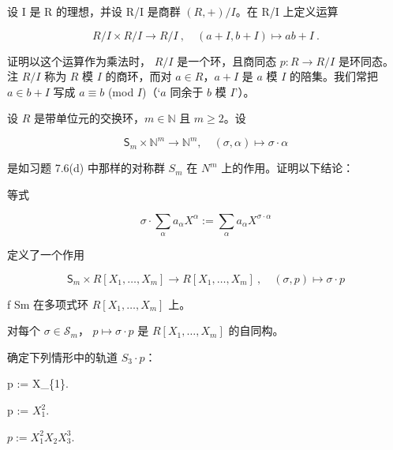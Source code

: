 \begin{exercises}
\begin{items}
\item

设 I 是 R 的理想，并设 R/I 是商群  $ (R, +)/I $。在 R/I 上定义运算

\[
R/I\times R/I\to R/I~,\quad(a+I,b+I)\mapsto a b+I~.
\]

证明以这个运算作为乘法时， $ R/I $ 是一个环，且商同态  $ p: R \to R/I $ 是环同态。
注 $R/I$ 称为 $R$ 模 $I$ 的商环，而对 $a \in R$，$a + I$ 是 $a$ 模 $I$ 的陪集。我们常把 $a \in b + I$ 写成 $a \equiv b$ (mod $I$)（‘$a$ 同余于 $b$ 模 $I$’）。

\end{items}

\item

设 $R$ 是带单位元的交换环，$m \in \mathbb{N}$ 且 $m \geq 2$。设

\[
\mathsf{S}_{m}\times\mathbb{N}^{m}\to\mathbb{N}^{m},\quad(\sigma,\alpha)\mapsto\sigma\cdot\alpha
\]

是如习题 7.6(d) 中那样的对称群  $ S_m $ 在  $ N^m $ 上的作用。证明以下结论：

\begin{items}
\item

等式

\[
\sigma\cdot\textstyle\sum_{\alpha}a_{\alpha}X^{\alpha}:=\sum_{\alpha}a_{\alpha}X^{\sigma\cdot\alpha}
\]

定义了一个作用

\[
\mathsf{S}_{m}\times R[X_{1},\ldots,X_{m}]\to R[X_{1},\ldots,X_{m}]~,\quad(\sigma,p)\mapsto\sigma\cdot p
\]

f Sm 在多项式环  $ R[X_1,\ldots,X_m] $ 上。

\item

对每个  $ \sigma \in \mathcal{S}_m $， $ p \mapsto \sigma \cdot p $ 是  $ R[X_1, \ldots, X_m] $ 的自同构。

\item

确定下列情形中的轨道  $ S_{3} \cdot p $：

\begin{subitems}
\item

p := X\_\{1\}.

\item

p :=  $ X_{1}^{2} $.

\item

$ p := X_1^2 X_2 X_3^3 $.


\end{subitems}
\end{items}
\end{exercises}
